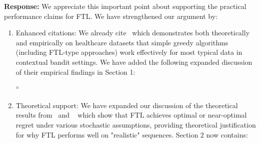 \documentclass[11pt]{article}
\begin{document}
\begin{enumerate}
{\bf Response:} We appreciate this important point about supporting the practical performance claims for FTL. We have strengthened our argument by:

\begin{enumerate}
    \item Enhanced citations: We already cite~\cite{bastani2021mostly} which demonstrates both theoretically and empirically on healthcare datasets that simple greedy algorithms (including FTL-type approaches) work effectively for most typical data in contextual bandit settings. We have added the following expanded discussion of their empirical findings in Section 1:

    ``

\item Theoretical support: We have expanded our discussion of the theoretical results from~\cite{Huang--Lattimore--Gyorgy--Szapesvari2016} and ~\cite{kotlowski2018minimaxity} which show that FTL achieves optimal or near-optimal regret under various stochastic assumptions, providing theoretical justification for why FTL performs well on "realistic" sequences. Section 2 now contains:


\end{enumerate}
\end{enumerate}
\end{document}
